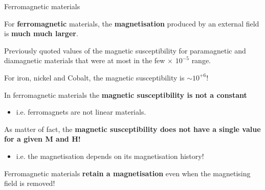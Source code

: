 %
%
%

\begin{frame}{Ferromagnetic materials}

For {\bf ferromagnetic} materials, the {\bf magnetisation} produced by an external field is {\bf much much larger}.

\begin{itemize}
{\small
  \item Previously quoted values of the magnetic susceptibility
           for paramagnetic and diamagnetic materials that were at most in the few $\times$ $10^{-5}$ range.
  \item For iron, nickel and Cobalt, the magnetic susceptibility is $\sim 10^{+6}$!
}
\end{itemize}

\vspace{0.2cm}

In ferromagnetic materials the {\bf magnetic susceptibility is not a constant}
\begin{itemize}
   \item i.e. ferromagnets are not linear materials.
\end{itemize}

As matter of fact,  the {\bf magnetic susceptibility does not have a single value for a given M and H!}
\begin{itemize}
   \item i.e. the magnetisation depends on its magnetisation history!
\end{itemize}

\vspace{0.2cm}

Ferromagnetic materials {\bf retain a magnetisation} even when the magnetising field is removed!

\end{frame}

%
%
%

